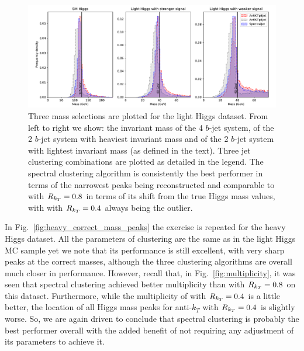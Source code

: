 \begin{figure}[htp]
    \includegraphics[width=1.\textwidth]{graphics/mass_peaks/light_long_correct_lines}
    \caption{Three mass selections are plotted for the light Higgs dataset. From left to right we show: the invariant mass of the 4 $b$-jet system, of the 2 $b$-jet system with heaviest invariant mass and of the 2 $b$-jet system with lightest invariant mass (as defined in the text).   Three jet clustering combinations are plotted as detailed in the legend.
        The spectral clustering algorithm is consistently the best performer in terms of the narrowest peaks being reconstructed and comparable to \antikt{} with \(R_{k_T}{} = 0.8\) in terms of its shift from the true Higgs mass values, with \antikt{} with \(R_{k_T}{} = 0.4\) always being the outlier. 
    }\label{fig:best_correct_h_allocation}
\end{figure}    

In 
Fig.~\ref{fig:heavy_correct_mass_peaks} the exercise is repeated for the heavy Higgs dataset.
All the parameters of \spectral{} clustering are the same as in the light Higgs MC sample yet we note that 
its performance is still excellent, with very sharp peaks at the correct masses, although the three clustering algorithms are overall much closer in performance.
However, recall that, in Fig.~\ref{fig:multiplicity},
it was seen that spectral clustering achieved better multiplicity than \antikt{} with \(R_{k_T}{} = 0.8\) on this dataset. Furthermore, 
while the multiplicity of \antikt{} with \(R_{k_T}{} = 0.4\) is a little better, the location of all Higgs mass peaks for anti-$k_T$ with 
\(R_{k_T} = 0.4\) is slightly worse. So, we are again driven to conclude that spectral clustering is probably the best performer overall with the added benefit of not requiring any adjustment of its parameters to achieve it. 

